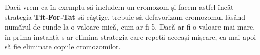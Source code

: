 Dacă vrem ca în exemplu să includem un cromozom și facem astfel încât strategia \textbf{Tit-For-Tat} să câștige, trebuie să defavorizam cromozomul lăsând numărul de runde la o valoare mică, cum ar fi 5. Dacă ar fi o valoare mai mare, în prima instanță s-ar elimina strategia care repetă aceeași mișcare, ca mai apoi să fie eliminate copiile cromozomilor. 










































































































